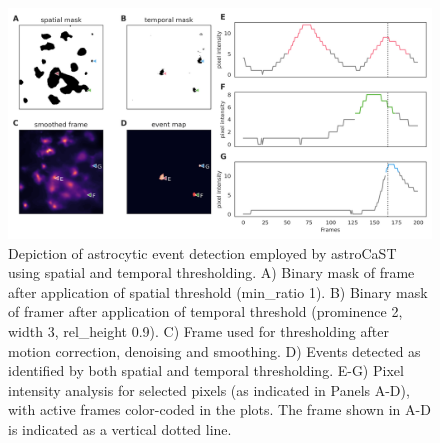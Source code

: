 \begin{figure}[!htb]
\begin{center}
\includegraphics[width=\linewidth]{figures/5.png}
\end{center}
\caption{
Depiction of astrocytic event detection employed by astroCaST using spatial and temporal thresholding. A) Binary mask of frame after application of spatial threshold (min\_ratio 1). B) Binary mask of framer after application of temporal threshold (prominence 2, width 3, rel\_height 0.9). C) Frame used for thresholding after motion correction, denoising and smoothing. D) Events detected as identified by both spatial and temporal thresholding. E-G) Pixel intensity analysis for selected pixels (as indicated in Panels A-D), with active frames color-coded in the plots. The frame shown in A-D is indicated as a vertical dotted line.
}\label{fig:5}
\end{figure}


